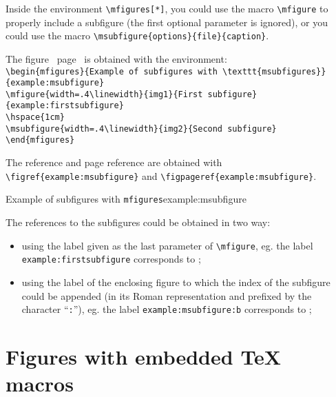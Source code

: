 \documentclass[book]{upmethodology-document}
\begin{document}
Inside the environment \texttt{{\textbackslash}mfigures[*]}, you could use the macro \texttt{{\textbackslash}mfigure} to properly include a subfigure (the first optional parameter is ignored), or you could use the macro \texttt{{\textbackslash}msubfigure\{options\}\{file\}\{caption\}}.

The figure~ page~ is obtained with the environment:\\
\texttt{{\textbackslash}begin\{mfigures\}\{Example of subfigures with {\textbackslash}texttt\{msubfigures\}\}\{example:msubfigure\}}\\
\texttt{{\textbackslash}mfigure\{width=.4{\textbackslash}linewidth\}\{img1\}\{First subfigure\}\{example:firstsubfigure\}} \\
\texttt{{\textbackslash}hspace\{1cm\}} \\
\texttt{{\textbackslash}msubfigure\{width=.4{\textbackslash}linewidth\}\{img2\}\{Second subfigure\}} \\
\texttt{{\textbackslash}end\{mfigures\}}

The reference and page reference are obtained with \texttt{{\textbackslash}figref\{example:msubfigure\}} and \texttt{{\textbackslash}figpageref\{example:msubfigure\}}.

\begin{mfigures}{Example of subfigures with \texttt{mfigures}}{example:msubfigure}
	\hspace{1cm}
\end{mfigures}

The references to the subfigures could be obtained in two way:\nopagebreak\begin{itemize}
\item using the label given as the last parameter of \texttt{{\textbackslash}mfigure}, eg. the label \texttt{example:firstsubfigure} corresponds to ;
\item using the label of the enclosing figure to which the index of the subfigure could be appended (in its Roman representation and prefixed by the character ``\texttt{:}''), eg. the label \texttt{example:msubfigure:b} corresponds to ;
\end{itemize}

\section{Figures with embedded \TeX\xspace macros}
\end{document}
